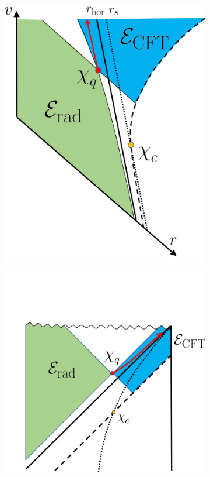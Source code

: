\documentclass[11pt,a4paper]{article}
\begin{document}
\begin{figure}[t]
\begin{subfigure}{.48\textwidth}
  \centering
 \includegraphics[width = 0.58\linewidth]{BH_Eddington.png}
\end{subfigure}
\begin{subfigure}{.48\textwidth}
  \centering
  \vspace{-2cm}
 \includegraphics[width = 0.9\linewidth]{BH_Penrose.png}
\end{subfigure}
\centering

\end{figure}
\end{document}

